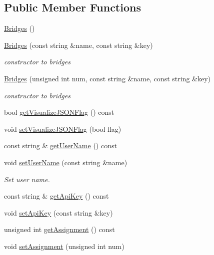 \subsection*{Public Member Functions}
\begin{DoxyCompactItemize}
\item 
\hyperlink{classbridges_1_1_bridges_aab8b250b2b5ba0034ceb2494fe5ea437}{Bridges} ()
\item 
\hyperlink{classbridges_1_1_bridges_a21d9e98cb1f3994300079b489f14e71e}{Bridges} (const string \&name, const string \&key)
\begin{DoxyCompactList}\small\item\em constructor to bridges \end{DoxyCompactList}\item 
\hyperlink{classbridges_1_1_bridges_aa58a928530695a5d0e9bf15fa09c8d84}{Bridges} (unsigned int num, const string \&name, const string \&key)
\begin{DoxyCompactList}\small\item\em constructor to bridges \end{DoxyCompactList}\item 
bool \hyperlink{classbridges_1_1_bridges_a6c2897b19a25989e09c031152a74317d}{get\+Visualize\+J\+S\+O\+N\+Flag} () const
\item 
void \hyperlink{classbridges_1_1_bridges_a69aca37ab2729d0345e0549d7baf0423}{set\+Visualize\+J\+S\+O\+N\+Flag} (bool flag)
\item 
const string \& \hyperlink{classbridges_1_1_bridges_ad16be2d94936fd555bc05f58c8c21f50}{get\+User\+Name} () const
\item 
void \hyperlink{classbridges_1_1_bridges_ab0b00033e54d25968f5ecb61c31c7de3}{set\+User\+Name} (const string \&name)
\begin{DoxyCompactList}\small\item\em Set user name. \end{DoxyCompactList}\item 
const string \& \hyperlink{classbridges_1_1_bridges_a9a44f38d883859ef19c94ce17eec43b5}{get\+Api\+Key} () const
\item 
void \hyperlink{classbridges_1_1_bridges_a3f9f21464393b8fce79a77809c6aa17e}{set\+Api\+Key} (const string \&key)
\item 
unsigned int \hyperlink{classbridges_1_1_bridges_aa45b4ba781b5cbecc8cb04c76dfd527a}{get\+Assignment} () const
\item 
void \hyperlink{classbridges_1_1_bridges_aca7a68fb8cc0d1bec81656dfa77b1162}{set\+Assignment} (unsigned int num)

\end{DoxyCompactItemize}
